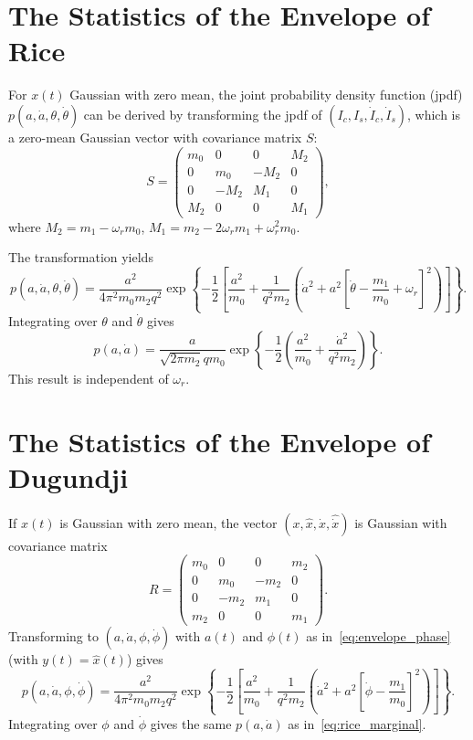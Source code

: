 \documentclass[12pt]{article}
\theoremstyle{plain}
\theoremstyle{definition}
\theoremstyle{remark}
\theoremstyle{plain}
\theoremstyle{definition}
\begin{document}
\section{The Statistics of the Envelope of Rice}
\label{sec:rice_stats}
For $x(t)$ Gaussian with zero mean, the joint probability density function (jpdf) $p(a, \dot{a}, \theta, \dot{\theta})$ can be derived by transforming the jpdf of $(I_c, I_s, \dot{I}_c, \dot{I}_s)$, which is a zero-mean Gaussian vector with covariance matrix $S$:
\begin{equation}
    S = \begin{pmatrix}
        m_0 & 0 & 0 & M_2 \\
        0 & m_0 & -M_2 & 0 \\
        0 & -M_2 & M_1 & 0 \\
        M_2 & 0 & 0 & M_1
    \end{pmatrix},
\end{equation}
where $M_2 = m_1 - \omega_r m_0$, $M_1 = m_2 - 2\omega_r m_1 + \omega_r^2 m_0$.

The transformation yields
\begin{equation}
    p(a, \dot{a}, \theta, \dot{\theta}) = \frac{a^2}{4\pi^2 m_0 m_2 q^2} \exp\left\{ -\frac{1}{2} \left[ \frac{a^2}{m_0} + \frac{1}{q^2 m_2} \left( \dot{a}^2 + a^2 [\dot{\theta} - \frac{m_1}{m_0} + \omega_r]^2 \right) \right] \right\}.
    \label{eq:rice_joint}
\end{equation}
Integrating over $\theta$ and $\dot{\theta}$ gives
\begin{equation}
    p(a, \dot{a}) = \frac{a}{\sqrt{2\pi m_2} q m_0} \exp\left\{ -\frac{1}{2} \left( \frac{a^2}{m_0} + \frac{\dot{a}^2}{q^2 m_2} \right) \right\}.
    \label{eq:rice_marginal}
\end{equation}
This result is independent of $\omega_r$.

\section{The Statistics of the Envelope of Dugundji}
\label{sec:dugundji_stats}
If $x(t)$ is Gaussian with zero mean, the vector $(x, \hat{x}, \dot{x}, \hat{\dot{x}})$ is Gaussian with covariance matrix
\begin{equation}
    R = \begin{pmatrix}
        m_0 & 0 & 0 & m_2 \\
        0 & m_0 & -m_2 & 0 \\
        0 & -m_2 & m_1 & 0 \\
        m_2 & 0 & 0 & m_1
    \end{pmatrix}.
\end{equation}
Transforming to $(a, \dot{a}, \phi, \dot{\phi})$ with $a(t)$ and $\phi(t)$ as in~\eqref{eq:envelope_phase} (with $y(t) = \hat{x}(t)$) gives
\begin{equation}
    p(a, \dot{a}, \phi, \dot{\phi}) = \frac{a^2}{4\pi^2 m_0 m_2 q^2} \exp\left\{ -\frac{1}{2} \left[ \frac{a^2}{m_0} + \frac{1}{q^2 m_2} \left( \dot{a}^2 + a^2 [\dot{\phi} - \frac{m_1}{m_0}]^2 \right) \right] \right\}.
    \label{eq:dugundji_joint}
\end{equation}
Integrating over $\phi$ and $\dot{\phi}$ gives the same $p(a, \dot{a})$ as in~\eqref{eq:rice_marginal}.
\end{document}
